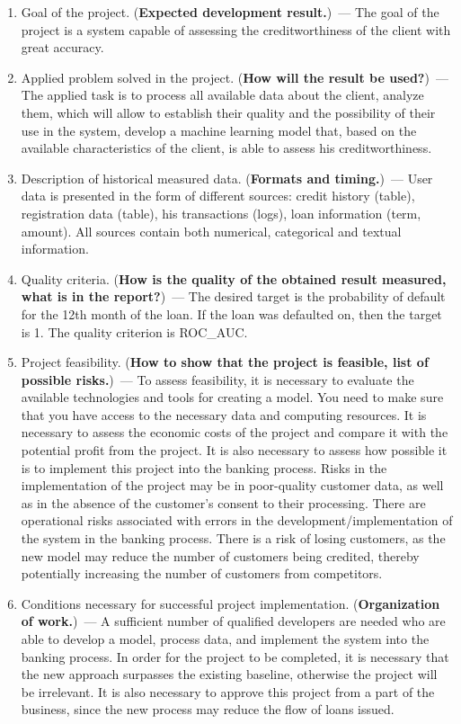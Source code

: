 \documentclass[12pt]{article}
\begin{document}
\begin{enumerate}
\item Goal of the project. (\textbf{Expected development result.})~--- The goal of the project is a system capable of assessing the creditworthiness of the client with great accuracy.
\item Applied problem solved in the project. (\textbf{How will the result be used?})~--- The applied task is to process all available data about the client, analyze them, which will allow to establish their quality and the possibility of their use in the system, develop a machine learning model that, based on the available characteristics of the client, is able to assess his creditworthiness. 
\item Description of historical measured data. (\textbf{Formats and timing.})~--- User data is presented in the form of different sources: credit history (table), registration data (table), his transactions (logs), loan information (term, amount). All sources contain both numerical, categorical and textual information.
\item Quality criteria. (\textbf{How is the quality of the obtained result measured, what is in the report?})~--- The desired target is the probability of default for the 12th month of the loan. If the loan was defaulted on, then the target is 1. The quality criterion is ROC\_AUC. 
\item Project feasibility. (\textbf{How to show that the project is feasible, list of possible risks.})~--- To assess feasibility, it is necessary to evaluate the available technologies and tools for creating a model. You need to make sure that you have access to the necessary data and computing resources. It is necessary to assess the economic costs of the project and compare it with the potential profit from the project. It is also necessary to assess how possible it is to implement this project into the banking process. Risks in the implementation of the project may be in poor-quality customer data, as well as in the absence of the customer's consent to their processing. There are operational risks associated with errors in the development/implementation of the system in the banking process. There is a risk of losing customers, as the new model may reduce the number of customers being credited, thereby potentially increasing the number of customers from competitors. 
\item Conditions necessary for successful project implementation. (\textbf{Organization of work.})~--- A sufficient number of qualified developers are needed who are able to develop a model, process data, and implement the system into the banking process. In order for the project to be completed, it is necessary that the new approach surpasses the existing baseline, otherwise the project will be irrelevant. It is also necessary to approve this project from a part of the business, since the new process may reduce the flow of loans issued. 

\end{enumerate}
\end{document}
